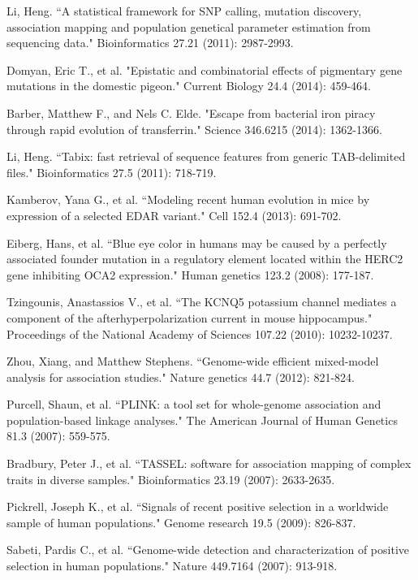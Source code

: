 \documentclass[10pt,letterpaper]{article}
\begin{document}
\begin{thebibliography}{10}
Li, Heng. ``A statistical framework for SNP calling, mutation discovery, association mapping and population genetical parameter estimation from sequencing data." Bioinformatics 27.21 (2011): 2987-2993.

Domyan, Eric T., et al. "Epistatic and combinatorial effects of pigmentary gene mutations in the domestic pigeon." Current Biology 24.4 (2014): 459-464.

Barber, Matthew F., and Nels C. Elde. "Escape from bacterial iron piracy through rapid evolution of transferrin." Science 346.6215 (2014): 1362-1366.

Li, Heng. ``Tabix: fast retrieval of sequence features from generic TAB-delimited files." Bioinformatics 27.5 (2011): 718-719.

Kamberov, Yana G., et al. ``Modeling recent human evolution in mice by expression of a selected EDAR variant." Cell 152.4 (2013): 691-702.

Eiberg, Hans, et al. ``Blue eye color in humans may be caused by a perfectly associated founder mutation in a regulatory element located within the HERC2 gene inhibiting OCA2 expression." Human genetics 123.2 (2008): 177-187.

Tzingounis, Anastassios V., et al. ``The KCNQ5 potassium channel mediates a component of the afterhyperpolarization current in mouse hippocampus." Proceedings of the National Academy of Sciences 107.22 (2010): 10232-10237.

Zhou, Xiang, and Matthew Stephens. ``Genome-wide efficient mixed-model analysis for association studies." Nature genetics 44.7 (2012): 821-824.

Purcell, Shaun, et al. ``PLINK: a tool set for whole-genome association and population-based linkage analyses." The American Journal of Human Genetics 81.3 (2007): 559-575.

Bradbury, Peter J., et al. ``TASSEL: software for association mapping of complex traits in diverse samples." Bioinformatics 23.19 (2007): 2633-2635.

Pickrell, Joseph K., et al. ``Signals of recent positive selection in a worldwide sample of human populations." Genome research 19.5 (2009): 826-837.

Sabeti, Pardis C., et al. ``Genome-wide detection and characterization of positive selection in human populations." Nature 449.7164 (2007): 913-918.


\end{thebibliography}
\end{document}
